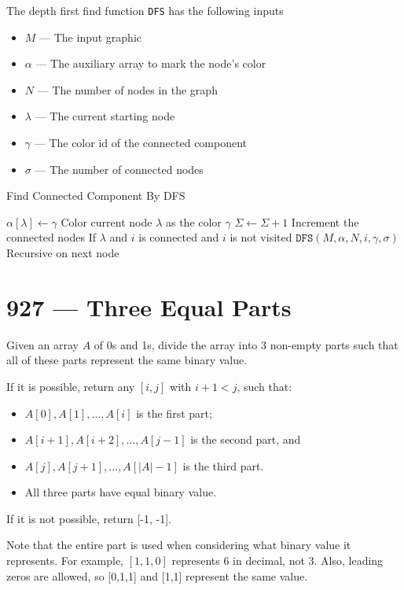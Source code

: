 The depth first find function \texttt{DFS} has the following inputs
\begin{itemize}
    \item $M$ --- The input graphic
    \item $\alpha$ --- The auxiliary array to mark the node's color
    \item $N$ --- The number of nodes in the graph
    \item $\lambda$ --- The current starting node
    \item $\gamma$ --- The color id of the connected component
    \item $\sigma$ --- The number of connected nodes
\end{itemize}
\begin{algorithm}[H]
\caption{Find Connected Component By DFS}
\label{924DFS}
\begin{algorithmic}[1]
\State $\alpha[\lambda] \gets \gamma$ \Comment Color current node $\lambda$ as the color $\gamma$
\State $\Sigma \gets \Sigma + 1$ \Comment Increment the connected nodes
 \Comment If $\lambda$ and $i$ is connected and $i$ is not visited
\State $\mathtt{DFS}(M, \alpha, N, i, \gamma, \sigma)$ \Comment Recursive on next node
\EndIf
\EndFor
\EndFunction
\end{algorithmic}
\end{algorithm}

\section{927 --- Three Equal Parts}
Given an array $A$ of 0s and 1s, divide the array into 3 non-empty parts such that all of these parts represent the same binary value.
\par
If it is possible, return any $[i, j]$ with $i+1 < j$, such that:
\begin{itemize}
    \item $A[0], A[1], \ldots, A[i]$ is the first part;
    \item $A[i+1], A[i+2], \ldots, A[j-1]$ is the second part, and
    \item $A[j], A[j+1], ..., A[|A| - 1]$ is the third part.
    \item All three parts have equal binary value.
\end{itemize}
\par
If it is not possible, return [-1, -1].
\par
Note that the entire part is used when considering what binary value it represents.  For example, $[1,1,0]$ represents 6 in decimal, not 3.  Also, leading zeros are allowed, so [0,1,1] and [1,1] represent the same value.
